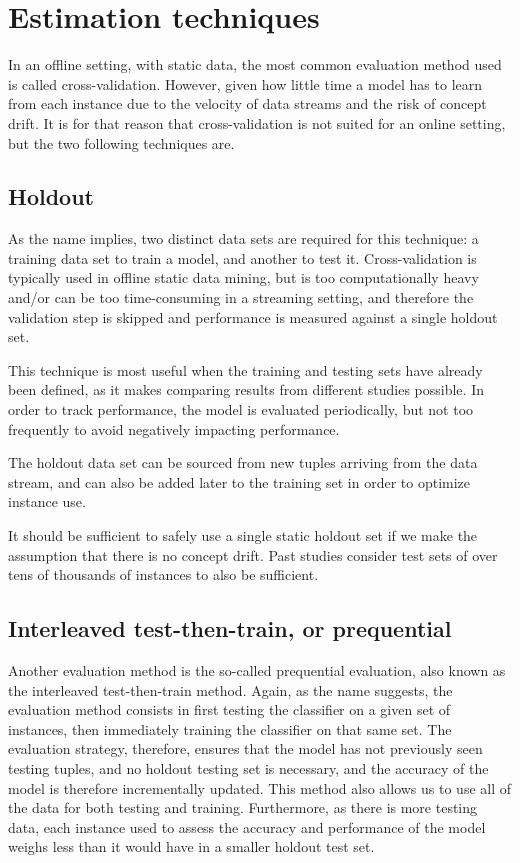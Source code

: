 \section{Estimation techniques}
In an offline setting, with static data, the most common evaluation method used is called cross-validation. However, given how little time a model has to learn from each instance due to the velocity of data streams and the risk of concept drift. It is for that reason that cross-validation is not suited for an online setting, but the two following techniques are.

\subsection{Holdout}
As the name implies, two distinct data sets are required for this technique: a training data set to train a model, and another to test it.  Cross-validation is typically used in offline static data mining, but is too computationally heavy and/or can be too time-consuming in a streaming setting, and therefore the validation step is skipped and performance is measured against a single holdout set.\cite{bifet2009data}
 
This technique is most useful when the training and testing sets have already been defined, as it makes comparing results from different studies possible.
In order to track performance, the model is evaluated periodically, but not too frequently to avoid negatively impacting performance.

The holdout data set can be sourced from new tuples arriving from the data stream, and can also be added later to the training set in order to optimize instance use.

It should be sufficient to safely use a single static holdout set if we make the assumption that there is no concept drift. Past studies consider test sets of over tens of thousands of instances to also be sufficient. 

\subsection{Interleaved test-then-train, or prequential}
Another evaluation method is the so-called prequential evaluation, also known as the interleaved test-then-train method. Again, as the name suggests, the evaluation method consists in first testing the classifier on a given set of instances, then immediately training the classifier on that same set. The evaluation strategy, therefore, ensures that the model has not previously seen testing tuples, and no holdout testing set is necessary, and the accuracy of the model is therefore incrementally updated. This method also allows us to use all of the data for both testing and training. Furthermore, as there is more testing data, each instance used to assess the accuracy and performance of the model weighs less than it would have in a smaller holdout test set.

